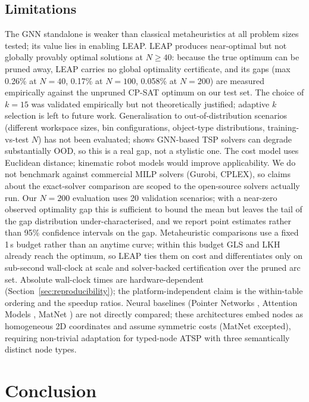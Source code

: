 \documentclass[review,times]{elsarticle}
\begin{document}
\subsection{Limitations}

The GNN standalone is weaker than classical metaheuristics at all problem sizes tested; its value lies in enabling LEAP. LEAP produces near-optimal but not globally provably optimal solutions at $N{\ge}40$: because the true optimum can be pruned away, LEAP carries no global optimality certificate, and its gaps (max 0.26\% at $N{=}40$, 0.17\% at $N{=}100$, 0.058\% at $N{=}200$) are measured empirically against the unpruned CP-SAT optimum on our test set. The choice of $k{=}15$ was validated empirically but not theoretically justified; adaptive $k$ selection is left to future work. Generalisation to out-of-distribution scenarios (different workspace sizes, bin configurations, object-type distributions, training-vs-test $N$) has not been evaluated; \cite{joshi2021rethinking} shows GNN-based TSP solvers can degrade substantially OOD, so this is a real gap, not a stylistic one. The cost model uses Euclidean distance; kinematic robot models would improve applicability. We do not benchmark against commercial MILP solvers (Gurobi, CPLEX), so claims about the exact-solver comparison are scoped to the open-source solvers actually run. Our $N{=}200$ evaluation uses 20 validation scenarios; with a near-zero observed optimality gap this is sufficient to bound the mean but leaves the tail of the gap distribution under-characterised, and we report point estimates rather than 95\% confidence intervals on the gap. Metaheuristic comparisons use a fixed 1\,s budget rather than an anytime curve; within this budget GLS and LKH already reach the optimum, so LEAP ties them on cost and differentiates only on sub-second wall-clock at scale and solver-backed certification over the pruned arc set. Absolute wall-clock times are hardware-dependent (Section~\ref{sec:reproducibility}); the platform-independent claim is the within-table ordering and the speedup ratios. Neural baselines (Pointer Networks \cite{vinyals2015pointer}, Attention Models \cite{kool2019attention}, MatNet \cite{kwon2021matnet}) are not directly compared; these architectures embed nodes as homogeneous 2D coordinates and assume symmetric costs (MatNet excepted), requiring non-trivial adaptation for typed-node ATSP with three semantically distinct node types.

\section{Conclusion}\label{sec:conclusion}
\end{document}
